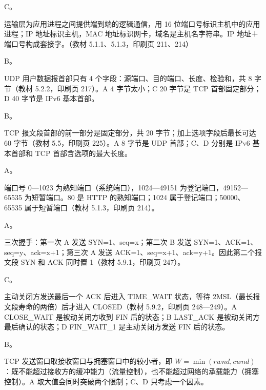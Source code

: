 \documentclass[a4paper,11pt]{article}
\begin{document}


\q C。\begin{analysis}运输层为应用进程之间提供端到端的逻辑通信，用 16 位端口号标识主机中的应用进程；IP 地址标识主机，MAC 地址标识网卡，域名是主机名字符串。IP 地址＋端口号构成套接字。（教材 5.1.1、5.1.3，印刷页 211、214）\end{analysis}

\q B。\begin{analysis}UDP 用户数据报首部只有 4 个字段：源端口、目的端口、长度、检验和，共 8 字节（教材 5.2.2，印刷页 217）。A 4 字节太小；C 20 字节是 TCP 首部固定部分；D 40 字节是 IPv6 基本首部。\end{analysis}

\q B。\begin{analysis}TCP 报文段首部的前一部分是固定部分，共 20 字节；加上选项字段后最长可达 60 字节（教材 5.5，印刷页 225）。A 8 字节是 UDP 首部；C、D 分别是 IPv6 基本首部和 TCP 首部含选项的最大长度。\end{analysis}

\q A。\begin{analysis}端口号 0—1023 为熟知端口（系统端口），1024—49151 为登记端口，49152—65535 为短暂端口。80 是 HTTP 的熟知端口；1024 属于登记端口；50000、65535 属于短暂端口（教材 5.1.3，印刷页 214）。\end{analysis}

\q A。\begin{analysis}三次握手：第一次 A 发送 SYN=1、seq=x；第二次 B 发送 SYN=1、ACK=1、seq=y、ack=x+1；第三次 A 发送 ACK=1、seq=x+1、ack=y+1。因此第二个报文段 SYN 和 ACK 同时置 1（教材 5.9.1，印刷页 247）。\end{analysis}

\q C。\begin{analysis}主动关闭方发送最后一个 ACK 后进入 TIME\_WAIT 状态，等待 2MSL（最长报文段寿命的两倍）后才进入 CLOSED（教材 5.9.2，印刷页 248—249）。A CLOSE\_WAIT 是被动关闭方收到 FIN 后的状态；B LAST\_ACK 是被动关闭方最后确认的状态；D FIN\_WAIT\_1 是主动关闭方发送 FIN 后的状态。\end{analysis}

\q B。\begin{analysis}TCP 发送窗口取接收窗口与拥塞窗口中的较小者，即 $W=\min(rwnd,cwnd)$：既不能超过接收方的缓冲能力（流量控制），也不能超过网络的承载能力（拥塞控制）。A 取大值会同时突破两个限制；C、D 只考虑一个因素。\end{analysis}
\end{document}
